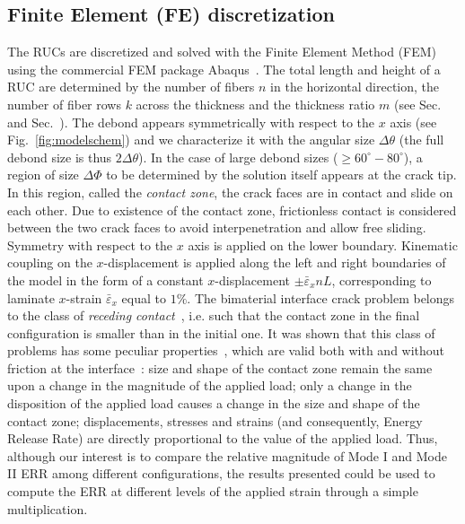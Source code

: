 \documentclass[Review,sagev,times]{sagej}
\begin{document}

\subsection{Finite Element (FE) discretization}

The RUCs are discretized and solved with the Finite Element Method (FEM) using the commercial FEM package Abaqus~\cite{abq12}. The total length and height of a RUC are determined by the number of fibers $n$ in the horizontal direction, the number of fiber rows $k$ across the thickness and the thickness ratio $m$ (see Sec.~ and Sec.~). The debond appears symmetrically with respect to the $x$ axis (see Fig.~\ref{fig:modelschem}) and we characterize it with the angular size $\Delta\theta$ (the full debond size is thus $2\Delta\theta$). In the case of large debond sizes ($\geq 60^{\circ}-80^{\circ}$), a region of size $\Delta\Phi$ to be determined by the solution itself appears at the crack tip. In this region, called the \emph{contact zone}, the crack faces are in contact and slide on each other. Due to existence of the contact zone, frictionless contact is considered between the two crack faces to avoid interpenetration and allow free sliding. Symmetry with respect to the $x$ axis is applied on the lower boundary. Kinematic coupling on the $x$-displacement is applied along the left and right boundaries of the model in the form of a constant $x$-displacement $\pm\bar{\varepsilon}_{x} nL$, corresponding to laminate $x$-strain $\bar{\varepsilon}_{x}$ equal to $1\%$. The bimaterial interface crack problem belongs to the class of \emph{receding contact}~\cite{Paris1996,Garrido1991}, i.e. such that the contact zone in the final configuration is smaller than in the initial one. It was shown that this class of problems has some peculiar properties~\cite{Keer1972,Tsai1974}, which are valid both with and without friction at the interface~\cite{Paris1996,Garrido1991}: size and shape of the contact zone remain the same upon a change in the magnitude of the applied load; only a change in the disposition of the applied load causes a change in the size and shape of the contact zone; displacements, stresses and strains (and consequently, Energy Release Rate) are directly proportional to the value of the applied load. Thus, although our interest is to compare the relative magnitude of Mode I and Mode II ERR among different configurations, the results presented could be used to compute the ERR at different levels of the applied strain through a simple multiplication.\\
\end{document}
